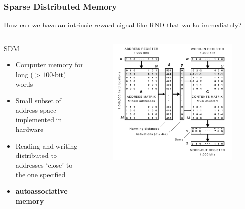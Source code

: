 \documentclass{beamer}
\begin{document}
\begin{frame}
  \frametitle{Sparse Distributed Memory}
  How can we have an intrinsic reward signal like RND that works immediately?
  \begin{columns}
    \begin{alertblock}{SDM}
      \begin{itemize}
        \item Computer memory for long ($>100$-bit) words
        \item Small subset of address space implemented in hardware
        \item Reading and writing distributed to addresses `close' to the one specified
        \item \textbf{autoassociative memory}
      \end{itemize}
    \end{alertblock}
    \begin{figure}
      \includegraphics[scale=0.25]{assets/sdm.png}
    \end{figure}
  \end{columns}
\end{frame}
\end{document}
